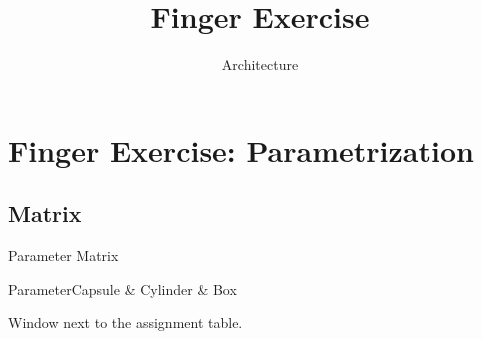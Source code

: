 \documentclass[theme=light,language=en]{assignment}
\title{Finger Exercise}
\author{Architecture}
\date{}
\begin{document}
\section{Finger Exercise: Parametrization}
\subsection{Matrix}
\begin{AssignmentTable}{Parameter Matrix}
\begin{AssignmentParameterMatrix}[type-columns=3,parameter-rows=3]{Parameter}{Capsule & Cylinder & Box}
\end{AssignmentParameterMatrix}
\end{AssignmentTable}
\begin{Window}[title={Notes}]
Window next to the assignment table.
\end{Window}
\end{document}
